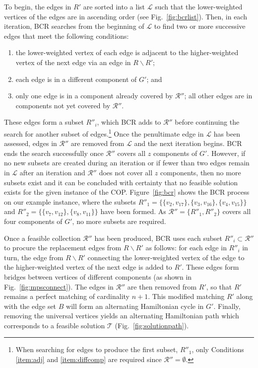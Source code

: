 \documentclass[authoryear]{elsarticle}
\begin{document}
To begin, the edges in $R'$ are sorted into a list $\mathcal{L}$ such that the lower-weighted vertices of the edges are in ascending order (see Fig.~\ref{fig:bcrlist}). Then, in each iteration, BCR searches from the beginning of $\mathcal{L}$ to find two or more successive edges that meet the following conditions:
\begin{enumerate}[label={(\roman*)},itemsep=-2pt,topsep=2pt]
	\item the lower-weighted vertex of each edge is adjacent to the higher-weighted vertex of the next edge via an edge in $R\backslash R'$;\label{item:adj}
	\item each edge is in a different component of $G'$; \label{item:diffcomp} and
	\item only one edge is in a component already covered by $\mathcal{R}''$; all other edges are in components not yet covered by $\mathcal{R}''$.\label{item:overlap}
\end{enumerate} 
These edges form a subset $R''_i$, which BCR adds to $\mathcal{R}''$ before continuing the search for another subset of edges.\footnote{When searching for edges to produce the first subset, $R''_1$, only Conditions \ref{item:adj} and \ref{item:diffcomp} are required since $\mathcal{R}'' = \emptyset$.} Once the penultimate edge in $\mathcal{L}$ has been assessed, edges in $\mathcal{R}''$ are removed from $\mathcal{L}$ and the next iteration begins. BCR ends the search successfully once $\mathcal{R}''$ covers all $z$ components of $G'$. However, if no new subsets are created during an iteration or if fewer than two edges remain in $\mathcal{L}$ after an iteration and $\mathcal{R}''$ does not cover all $z$ components, then no more subsets exist and it can be concluded with certainty that no feasible solution exists for the given instance of the COP. Figure~\ref{fig:bcr} shows the BCR process on our example instance, where the subsets $R''_1 = \{\{v_2, v_{17}\},\{v_3, v_{16}\}, \{v_4, v_{15}\}\}$ and $R''_2 = \{\{v_7, v_{12}\}, \{v_8, v_{11}\}\}$ have been formed. As $\mathcal{R}'' =\{R''_1, R''_2\}$ covers all four components of $G'$, no more subsets are required.

Once a feasible collection $\mathcal{R}''$ has been produced, BCR uses each subset $R''_i \subset \mathcal{R}''$ to procure the replacement edges from $R\backslash R'$ as follows: for each edge in $R''_i$ in turn, the edge from $R \backslash R'$ connecting the lower-weighted vertex of the edge to the higher-weighted vertex of the next edge is added to $R'$. These edges form bridges between vertices of different components (as shown in Fig.~\ref{fig:mpsconnect}). The edges in $\mathcal{R}''$ are then removed from $R'$, so that $R'$ remains a perfect matching of cardinality $n+1$. This modified matching $R'$ along with the edge set $B$ will form an alternating Hamiltonian cycle in $G'$. Finally, removing the universal vertices yields an alternating Hamiltonian path which corresponds to a feasible solution $\mathcal{T}$ (Fig.~\ref{fig:solutionpath}).
\end{document}

